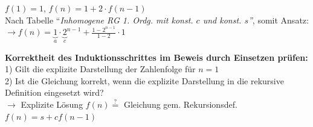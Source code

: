 \documentclass[8pt,landscape]{scrartcl}
\begin{document}
\begin{multicols}{3}
$f(1) = 1$, $f(n) = 1 + 2 \cdot f(n-1)$\\
Nach Tabelle ``\textit{Inhomogene RG 1. Ordg. mit konst. $c$ und konst. $s$''}, somit Ansatz:\\
$\rightarrow f(n) = \underbrace{1}_{a} \cdot {\underbrace{2}_{c}}^{n-1} + \frac{1 - 2^{n-1}}{1-2} \cdot 1$



\textbf{Korrektheit des Induktionsschrittes im Beweis durch Einsetzen pr\"ufen:}\\
1) Gilt die explizite Darstellung der Zahlenfolge f\"ur $n=1$\\
2) Ist die Gleichung korrekt, wenn die explizite Darstellung in die rekursive Definition eingesetzt wird?\\
$\rightarrow$ Explizite L\"osung $f(n) \stackrel{?}{=}$ Gleichung gem. Rekursionsdef. $f(n) = s + c f(n-1)$






\end{multicols}
\end{document}
